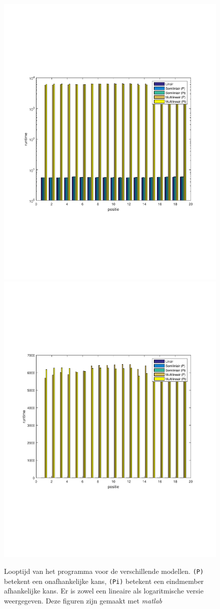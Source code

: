 \documentclass[12pt]{report}
\begin{document}
\begin{figure}
\includegraphics[width=0.79\linewidth,trim=0 200 0 175 cm]{exp_runtime.pdf}
\includegraphics[width=0.79\linewidth,trim=0 200 0 175 cm]{exp_runtime_honest.pdf}
\caption{Looptijd van het programma voor de verschillende modellen. \texttt{(P)} betekent een onafhankelijke kans, \texttt{(Pi)} betekent een eindmember afhankelijke kans. Er is zowel een lineaire als logaritmische versie weergegeven. Deze figuren zijn gemaakt met \textit{matlab}\cite{MATLAB} \label{fig:runtime}}
\end{figure}
\end{document}
